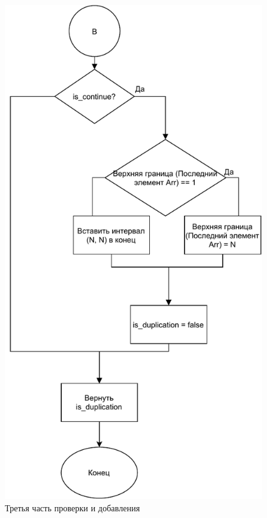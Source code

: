 \documentclass[14pt, a4paper]{extarticle}
\begin{document}
\begin{figure}[H]
	\centering
	\includegraphics[scale=1]{check3.pdf}
	\caption{Третья часть проверки и добавления}
	\label{check3}
\end{figure}
\end{document}
